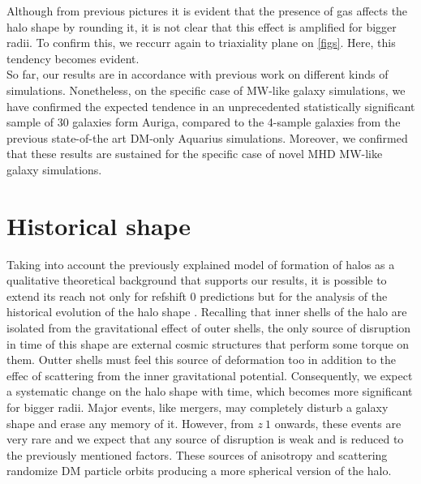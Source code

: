 Although from previous pictures it is evident that the presence of gas affects the halo shape by rounding it, it is not clear that this effect is amplified for bigger radii. To confirm this, we reccurr again to triaxiality plane on \ref{figs}. Here, this tendency becomes evident.\\


So far, our results are in accordance with previous work on different kinds of simulations. Nonetheless, on the specific case of MW-like galaxy simulations, we have confirmed the expected tendence in an unprecedented statistically significant sample of 30 galaxies form Auriga, compared to the 4-sample galaxies from the previous state-of-the art DM-only Aquarius simulations. Moreover, we confirmed that these results are sustained for the specific case of novel MHD MW-like galaxy simulations.\\

\section{Historical shape}
Taking into account the previously explained model of formation of halos as a qualitative theoretical background that supports our results, it is possible to extend 
its reach not only for refshift 0 predictions but for the analysis of the historical evolution of the halo shape \cite{}. Recalling that inner shells of the halo are isolated from the gravitational effect of outer shells, the only source of disruption in time of this shape are external cosmic structures that perform some torque on them. Outter shells must feel this source of deformation too in addition to the effec of scattering from the inner gravitational potential. Consequently, we expect a systematic change on the halo shape with time, which becomes more significant for bigger radii. Major events, like mergers, may completely disturb a galaxy shape and erase any memory of it. However, from $z~1$ onwards, these events are very rare \cite{} and we expect that any source of disruption is weak and is reduced to the previously mentioned factors. These sources of anisotropy and scattering randomize DM particle orbits producing a more spherical version of the halo. \cite{} \\  

